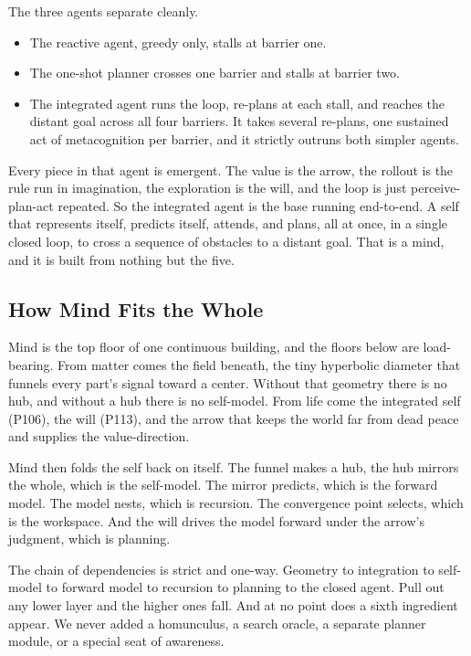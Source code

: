 The three agents separate cleanly.

\begin{itemize}
\item The reactive agent, greedy only, stalls at barrier one.
\item The one-shot planner crosses one barrier and stalls at barrier two.
\item The integrated agent runs the loop, re-plans at each stall, and reaches the distant goal across all four barriers. It takes several re-plans, one sustained act of metacognition per barrier, and it strictly outruns both simpler agents.
\end{itemize}

Every piece in that agent is emergent. The value is the arrow, the rollout is the rule run in imagination, the exploration is the will, and the loop is just perceive-plan-act repeated. So the integrated agent is the base running end-to-end. A self that represents itself, predicts itself, attends, and plans, all at once, in a single closed loop, to cross a sequence of obstacles to a distant goal. That is a mind, and it is built from nothing but the five.

\subsection{How Mind Fits the Whole}

Mind is the top floor of one continuous building, and the floors below are load-bearing. From matter comes the field beneath, the tiny hyperbolic diameter that funnels every part's signal toward a center. Without that geometry there is no hub, and without a hub there is no self-model. From life come the integrated self (P106), the will (P113), and the arrow that keeps the world far from dead peace and supplies the value-direction.

Mind then folds the self back on itself. The funnel makes a hub, the hub mirrors the whole, which is the self-model. The mirror predicts, which is the forward model. The model nests, which is recursion. The convergence point selects, which is the workspace. And the will drives the model forward under the arrow's judgment, which is planning.

The chain of dependencies is strict and one-way. Geometry to integration to self-model to forward model to recursion to planning to the closed agent. Pull out any lower layer and the higher ones fall. And at no point does a sixth ingredient appear. We never added a homunculus, a search oracle, a separate planner module, or a special seat of awareness.

